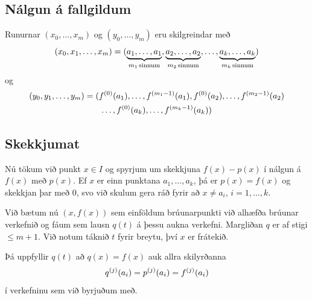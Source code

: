 \documentclass[letterpaper,10pt,icelandic]{sphinxmanual}
\begin{document}
\subsection{Nálgun á fallgildum}
\label{kafli03:nalgun-a-fallgildum}
Runurnar \((x_0,\ldots,x_m)\) og \((y_0,\ldots,y_m)\) eru
skilgreindar með
\begin{gather}
\begin{split}(x_0,x_1,\ldots,x_m) =
  (\underbrace{a_1, \ldots, a_1}_{m_1 \, \text{sinnum}},
  \underbrace{a_2, \ldots , a_2}_{m_2 \, \text{sinnum}},
  \ldots ,
  \underbrace{a_k, \ldots , a_k}_{m_k \, \text{sinnum}})\end{split}\notag
\end{gather}
og
\begin{gather}
\begin{split}\begin{gathered}
  (y_0,y_1,\ldots,y_m) =
  (f^{(0)}(a_1), \ldots, f^{(m_1-1)}(a_1),
f^{(0)}(a_2), \ldots, f^{(m_2-1)}(a_2) \\ \ldots,
  f^{(0)}(a_k), \ldots, f^{(m_k-1)}(a_k))
  \label{bru.margfald.5}\end{gathered}\end{split}\notag
\end{gather}

\subsection{Skekkjumat}
\label{kafli03:id8}
Nú tökum við punkt \(x \in I\) og spyrjum um skekkjuna
\(f(x) - p(x)\) í nálgun á \(f(x)\) með \(p(x)\). Ef
\(x\) er einn punktana \(a_1, \ldots, a_k\), þá er
\(p(x) = f(x)\) og skekkjan þar með 0, svo við skulum gera ráð fyrir
að \(x \not= a_i\), \(i = 1, \ldots, k\).

Við bætum nú \((x,f(x))\) sem einföldum brúunarpunkti við alhæfða
brúunar verkefnið og fáum sem lausn \(q(t)\) á þessu aukna verkefni.
Margliðan \(q\) er af stigi \(\leq m+1\). Við notum táknið
\(t\) fyrir breytu, því \(x\) er frátekið.

Þá uppfyllir \(q(t)\) að \(q(x) = f(x)\) auk allra skilyrðanna
\begin{gather}
\begin{split}q^{(j)}(a_i) = p^{(j)}(a_i) = f^{(j)}(a_i)\end{split}\notag
\end{gather}
í verkefninu sem við byrjuðum með.
\end{document}
